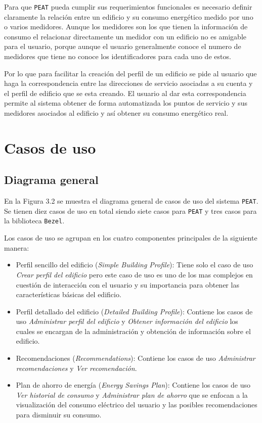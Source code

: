Para que \texttt{PEAT} pueda cumplir sus requerimientos funcionales es necesario
definir claramente la relación entre un edificio y su consumo energético medido
por uno o varios medidores.
Aunque los medidores son los que tienen la información de consumo el relacionar
directamente un medidor con un edificio no es amigable para el usuario, porque
aunque el usuario generalmente conoce el numero de medidores que tiene no conoce
los identificadores para cada uno de estos.

Por lo que para facilitar la creación del perfil de un edificio se pide al usuario
que haga la correspondencia entre las direcciones de servicio asociadas a su cuenta
y el perfil de edificio que se esta creando.
El usuario al dar esta correspondencia permite al sistema obtener de forma
automatizada los puntos de servicio y sus medidores asociados al edificio y así
obtener su consumo energético real.

\section{Casos de uso}

\subsection{Diagrama general}

En la Figura 3.2 se muestra el diagrama general de casos de uso del sistema
\texttt{PEAT}. Se tienen diez casos de uso en total siendo siete casos para
\texttt{PEAT} y tres casos para la biblioteca \texttt{Bezel}.

Los casos de uso se agrupan en los cuatro componentes principales de la
siguiente manera:

\begin{itemize}
\item Perfil sencillo del edificio (\textit{Simple Building Profile}): Tiene
  solo el caso de uso \textit{Crear perfil del edificio} pero este caso de uso
  es uno de los mas complejos en cuestión de interacción con el usuario y su
  importancia para obtener las características básicas del edificio.
\item Perfil detallado del edificio (\textit{Detailed Building Profile}): Contiene
  los casos de uso \textit{Administrar perfil del edificio} y
  \textit{Obtener información del edificio} los cuales se encargan de la
  administración y obtención de información sobre el edificio.
\item Recomendaciones (\textit{Recommendations}): Contiene los casos de uso
  \textit{Administrar recomendaciones} y \textit{Ver recomendación}.
\item Plan de ahorro de energía (\textit{Energy Savings Plan}): Contiene los
  casos de uso \textit{Ver historial de consumo} y \textit{Administrar plan de
    ahorro}
  que se enfocan a la visualización del consumo eléctrico del usuario y las
  posibles recomendaciones para disminuir su consumo.
\end{itemize}

